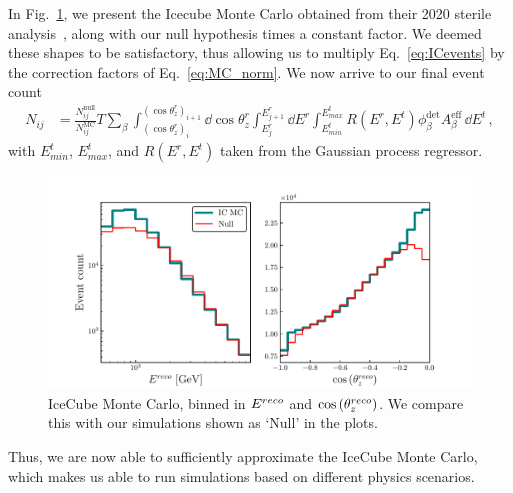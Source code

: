 In Fig.~\ref{fig:IC_MC_norm}, we present the Icecube Monte Carlo obtained from their 2020 sterile analysis~\cite{IC2020}, along
with our null hypothesis times a constant factor.  We deemed these shapes to be satisfactory, thus allowing us to multiply Eq.~\ref{eq:ICevents} by the 
correction factors of Eq.~\ref{eq:MC_norm}. We now arrive to our final event count
\begin{align}\label{eq:Nth}
    N_{ij} &= \frac{N_{ij}^\text{null}}{N_{ij}^\text{MC}} T \sum_\beta \int_{(\cos{\theta_z^r})_i}^{(\cos{\theta_z^r})_{i+1}} \dd \cos{\theta^r_z} \int_{E^r_{j}}^{E^r_{j+1}} \dd E^r 
    \int_{E^t_{min}}^{E^t_{max}} R(E^r,E^t) \phi_\beta^\text{det}  A^\text{eff}_\beta\, \dd E^t
    \,,
\end{align}
with $E^t_{min}$, $E^t_{max}$, and $R(E^r,E^t)$ taken from the Gaussian process regressor.
\begin{figure}[ht]
    \centering
    \includegraphics[width=0.8\linewidth]{figures/IC_MC_norm.pdf}
    \caption{IceCube Monte Carlo, binned in $E^{reco}$ and $\cos{(\theta_z^{reco})}$. We compare this with our simulations shown as `Null' in the plots.}\label{fig:IC_MC_norm}
\end{figure} 
Thus, we are now able to sufficiently approximate the IceCube Monte Carlo, which makes us able to run simulations based on different physics scenarios.
% 
% 
% 